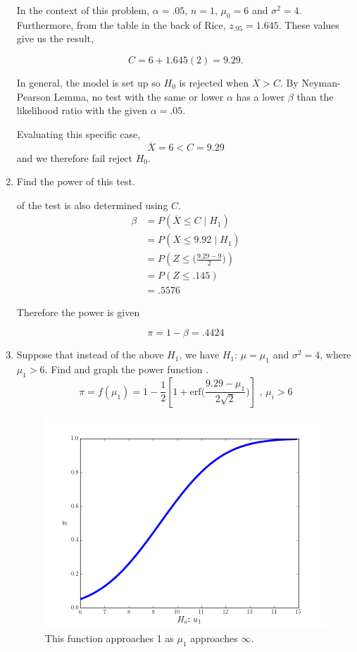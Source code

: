 \documentclass{tufte-book}
\newcommand{\erf}{\mathrm{erf}}
\theoremstyle{mytheoremstyle}
\theoremstyle{mylemstyle}
\theoremstyle{mydefstyle}
\begin{document}
\begin{enumerate}
In the context of this problem, $\alpha=.05$, $n=1$, $\mu_0=6$ and $\sigma^2=4$.  Furthermore, from the table in the back of Rice, $z_{.95} = 1.645$.  These values give us the result,

\[ C = 6 + 1.645(2) = 9.29. \]

In general, the model is set up so $H_0$ is rejected when $\overline{X} > C$.  By Neyman-Pearson Lemma, no test with the same or lower $\alpha$ has a lower $\beta$ than the likelihood ratio with the given $\alpha=.05$.

Evaluating this specific case,
\[ \overline{X} = 6 < C = 9.29 \]
and we therefore fail reject $H_0$.

\item Find the power of this test.

 of the test is also determined using $C$.
\begin{align*}
\beta &= P(\overline{X} \leq C \mid H_1)\\
&= P(\overline{X} \leq 9.92 \mid H_1)\\
&= P(Z \leq\Big(\frac{9.29 - 9}{2}\Big))\\
&= P(Z \leq .145)\\
&= .5576
\end{align*}

Therefore the power is given

\[ \pi = 1- \beta = .4424 \]

\item Suppose that instead of the above $H_1$, we have $H_1$: $\mu=\mu_1$ and $\sigma^2=4$, where $\mu_1 > 6$.  Find and graph the power function \marginnote{$\Phi (\frac{x-\mu}{\sigma}) = \frac{1}{2}[1+ \erf(\frac{x-\mu}{\sigma\sqrt{2}})]$}.
\[ \pi = f(\mu_1) = 1 - \frac{1}{2}[1 + \erf\Big(\frac{9.29-\mu_1}{2\sqrt{2}}\Big)] \text{ , } \mu_i > 6 \]

\begin{figure}
\includegraphics{power}
\caption{This function approaches 1 as $\mu_1$ approaches $\infty$.}
\end{figure}
\end{enumerate}
\end{document}
